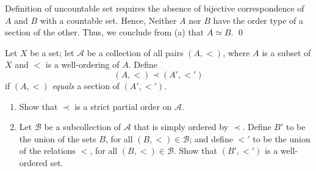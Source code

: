 \documentclass[a4paper,12pt]{article}
\begin{document}
\begin{sol}
	Definition of uncountable set requires the absence of bijective correspondence of  \( A \) and \( B \) with a countable set.
	Hence, Neither \( A \) nor \( B \) have the order type of a section of the other. 
	Thus, we conclude from (a) that \( A \simeq B\).
	\qed\end{sol}


\begin{exe}
	Let \( X \) be a set;
	let \( \mathcal{A} \) be a collection of all pairs \( (A,<) \),
	where \( A \) is a subset of \( X \) and \( < \) is a well-ordering of \( A \).
	Define
	\begin{equation*}
		(A,<) \prec (A',<')
	\end{equation*}
	if \( (A,<) \) \textit{equals} a section of \( (A',<') \).
	\begin{enumerate}
		\item
		      Show that \( \prec \) is a strict partial order on \( \mathcal{A} \).
		      
		\item
		      Let \( \mathcal{B} \) be a subcollection of \( \mathcal{A} \) that is simply ordered by \( \prec \).
		      Define \( B' \) to be the union of the sets \( B \),
		      for all \( (B,<)\in \mathcal{B} \);
		      and define \( <' \) to be the union of the relations \( < \),
		      for all \( (B,<)\in \mathcal{B} \).
		      Show that \( (B',<') \) is a well-ordered set.
	\end{enumerate}
\end{exe}
\end{document}
